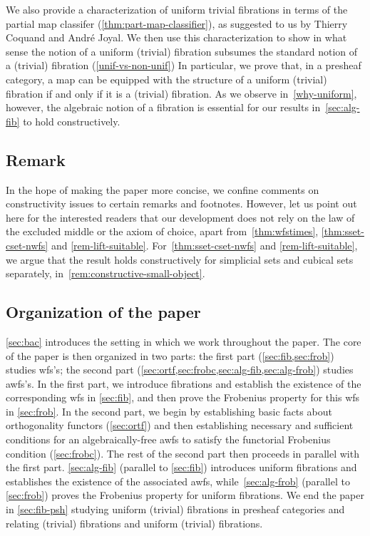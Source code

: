 \documentclass[reqno,10pt,a4paper,oneside,draft]{amsart}
\begin{document}
We also provide a characterization of uniform trivial fibrations in terms of the partial map classifer 
(\cref{thm:part-map-classifier}), as suggested to us by Thierry Coquand and Andr\'e Joyal.
We then use this characterization to show in what sense the notion of a uniform (trivial) fibration subsumes the standard notion of a (trivial) fibration (\cref{unif-vs-non-unif}) In particular, we prove that, in a presheaf category, a map can be equipped with the structure of a uniform (trivial) fibration if and only if it is a (trivial) fibration.
As we observe in~\cref{why-uniform}, however, the algebraic notion of a fibration is essential for our results in~\cref{sec:alg-fib} to hold constructively.

\subsection*{Remark}
In the hope of making the paper more concise, we confine comments on constructivity issues to certain remarks and footnotes.
However, let us point out here for the interested readers that our development does not rely on the law of the excluded middle or the axiom of choice, apart from~\cref{thm:wfstimes}, \cref{thm:sset-cset-nwfs} and \cref{rem-lift-suitable}.
For~\cref{thm:sset-cset-nwfs} and \cref{rem-lift-suitable}, we argue that the result holds constructively for simplicial sets and cubical sets separately, in~\cref{rem:constructive-small-object}.%

\subsection*{Organization of the paper} \cref{sec:bac} introduces the setting in which we work throughout the paper.
The core of the paper is then organized in two parts: the first part (\cref{sec:fib,sec:frob}) studies wfs's; the second part (\cref{sec:ortf,sec:frobc,sec:alg-fib,sec:alg-frob}) studies awfs's.
In the first part, we introduce fibrations and establish the existence of the corresponding wfs in \cref{sec:fib}, and then prove the Frobenius property for this wfs in \cref{sec:frob}.
In the second part, we begin by establishing basic facts about orthogonality functors (\cref{sec:ortf}) and then establishing necessary and sufficient conditions for an algebraically-free awfs to satisfy the functorial Frobenius condition (\cref{sec:frobc}).
The rest of the second part then proceeds in parallel with the first part.
\cref{sec:alg-fib} (parallel to \cref{sec:fib}) introduces uniform fibrations and establishes the existence of the associated awfs, while~\cref{sec:alg-frob} (parallel to \cref{sec:frob}) proves the Frobenius property for uniform fibrations.
We end the paper in \cref{sec:fib-psh} studying uniform (trivial) fibrations in presheaf categories and relating (trivial) fibrations and uniform (trivial) fibrations.
\end{document}
